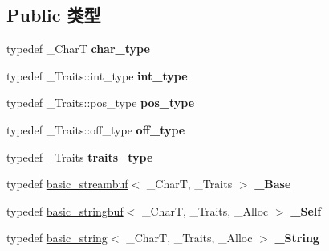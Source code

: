 \subsection*{Public 类型}
\begin{DoxyCompactItemize}
\item 
\mbox{\label{classbasic__stringbuf_a0f9c3580a51639b9cfead27a6f441e5e}} 
typedef \+\_\+\+CharT {\bfseries char\+\_\+type}
\item 
\mbox{\label{classbasic__stringbuf_a52aee5ec91b6d1468f1b8127b35d7a09}} 
typedef \+\_\+\+Traits\+::int\+\_\+type {\bfseries int\+\_\+type}
\item 
\mbox{\label{classbasic__stringbuf_a155c5aa85aee03791b574ad3644af42d}} 
typedef \+\_\+\+Traits\+::pos\+\_\+type {\bfseries pos\+\_\+type}
\item 
\mbox{\label{classbasic__stringbuf_a8ec5c8cbb9dce67fb2c3a05e8a63c84d}} 
typedef \+\_\+\+Traits\+::off\+\_\+type {\bfseries off\+\_\+type}
\item 
\mbox{\label{classbasic__stringbuf_a742d509efafd30c0612b801d4bfaf166}} 
typedef \+\_\+\+Traits {\bfseries traits\+\_\+type}
\item 
\mbox{\label{classbasic__stringbuf_a67739ea937a2dfaee0225ca9ec7d0870}} 
typedef \hyperlink{classbasic__streambuf}{basic\+\_\+streambuf}$<$ \+\_\+\+CharT, \+\_\+\+Traits $>$ {\bfseries \+\_\+\+Base}
\item 
\mbox{\label{classbasic__stringbuf_af5500a514695b155caf0b53239b6637e}} 
typedef \hyperlink{classbasic__stringbuf}{basic\+\_\+stringbuf}$<$ \+\_\+\+CharT, \+\_\+\+Traits, \+\_\+\+Alloc $>$ {\bfseries \+\_\+\+Self}
\item 
\mbox{\label{classbasic__stringbuf_a4341173bdf33b3edfd5202dc5ec3b05f}} 
typedef \hyperlink{classbasic__string}{basic\+\_\+string}$<$ \+\_\+\+CharT, \+\_\+\+Traits, \+\_\+\+Alloc $>$ {\bfseries \+\_\+\+String}
\end{DoxyCompactItemize}
